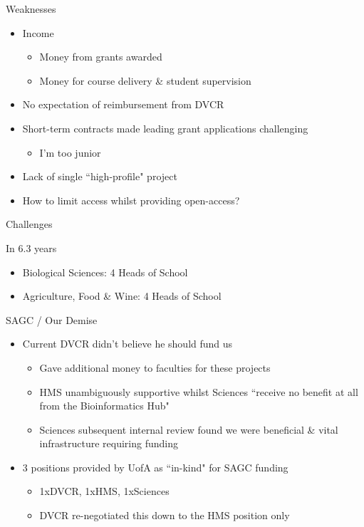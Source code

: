 \documentclass[11pt]{beamer}
\begin{document}
\begin{frame}{Weaknesses}

	\begin{itemize}
		\item Income
		\begin{itemize}
			\item Money from grants awarded
			\item Money for course delivery \& student supervision
		\end{itemize}		 
		\item No expectation of reimbursement from DVCR
		\item Short-term contracts made leading grant applications challenging
		\begin{itemize}
			\item I'm too junior
		\end{itemize}
		\item Lack of single ``high-profile" project
		\item How to limit access whilst providing open-access?\\[1cm]
	\end{itemize}

\end{frame}

\begin{frame}{Challenges}

In 6.3 years

	\begin{itemize}
		\item Biological Sciences: 4 Heads of School
		\item Agriculture, Food \& Wine: 4 Heads of School	
	\end{itemize}

\end{frame}

\begin{frame}{SAGC / Our Demise}

	\begin{itemize}
		\item Current DVCR didn't believe he should fund us
		\begin{itemize}
			\item Gave additional money to faculties for these projects
			\item HMS unambiguously supportive whilst Sciences ``receive no benefit at all from the Bioinformatics Hub"
			\item Sciences subsequent internal review found we were beneficial \& vital infrastructure requiring funding
		\end{itemize}
		\item 3 positions provided by UofA as ``in-kind" for SAGC funding 
		\begin{itemize}
			\item 1xDVCR, 1xHMS, 1xSciences
			\item DVCR re-negotiated this down to the HMS position only\\[5mm]
		\end{itemize}
	\end{itemize}

\end{frame}
\end{document}

